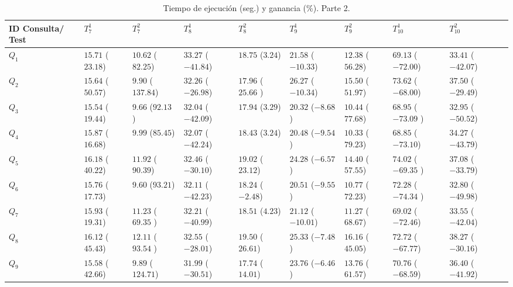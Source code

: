 \begin{table}
\renewcommand{\arraystretch}{1.3}
\begin{center}
\begin{tabular}{|p{1.5cm}|p{1.5cm}|p{1.5cm}|p{1.5cm}|p{1.5cm}|p{1.5cm}|p{1.5cm}|p{1.5cm}|p{1.5cm}|p{1.5cm}|}
\hline
\textbf{ID Consulta/ Test} & $T^{1}_{7}$ & $T^{2}_{7}$ & $T^{1}_{8}$ & $T^{2}_{8}$ & $T^{1}_{9}$ & $T^{2}_{9}$ & $T^{1}_{10}$ & $T^{2}_{10}$\\ \hline
  $Q_1$ & $15.71$ ($23.18$)  & $10.62$ ($82.25$) & $33.27$ ($-41.84$) & $18.75$ ($3.24$) & $21.58$ ($-10.33$) & $12.38$ ($56.28$) & $69.13$ ($-72.00$) & $33.41$ ($-42.07$) \\ \hline
  $Q_2$ & $15.64$ ($50.57$)  & $9.90$ ($137.84$) & $32.26$ ($-26.98$) & $17.96$ ($25.66$ ) & $26.27$ ($-10.34$) & $15.50$ ($51.97$) & $73.62$ ($-68.00$) & $37.50$ ($-29.49$) \\ \hline
  $Q_3$ & $15.54$ ($19.44$)  & $9.66$ ($92.13$ ) & $32.04$ ($-42.09$) & $17.94$ ($3.29$) & $20.32$ ($-8.68$) & $10.44$ ($77.68$) & $68.95$ ($-73.09$ ) & $32.95$ ($-50.52$) \\ \hline
  $Q_4$ & $15.87$ ($16.68$)  & $9.99$ ($85.45$) & $32.07$ ($-42.24$) & $18.43$ ($3.24$) & $20.48$ ($-9.54$) & $10.33$ ($79.23$) & $68.85$ ($-73.10$) & $34.27$ ($-43.79$) \\ \hline
  $Q_5$ & $16.18$ ($40.22$)  & $11.92$ ($90.39$) & $32.46$ ($-30.10$) & $19.02$ ($23.12$) & $24.28$ ($-6.57$) & $14.40$ ($57.55$) & $74.02$ ($-69.35$ ) & $37.08$ ($-33.79$) \\ \hline
  $Q_6$ & $15.76$ ($17.73$)  & $9.60$ ($93.21$) & $32.11$ ($-42.23$) & $18.24$ ($-2.48$) & $20.51$ ($-9.55$) & $10.77$ ($72.23$) & $72.28$ ($-74.34$ ) & $32.80$ ($-49.98$) \\ \hline
  $Q_7$ & $15.93$ ($19.31$)  & $11.23$ ($69.35$ ) & $32.21$ ($-40.99$) & $18.51$ ($4.23$) & $21.12$ ($-10.01$) & $11.27$ ($68.67$) & $69.02$ ($-72.46$) & $33.55$ ($-42.04$) \\ \hline
  $Q_8$ & $16.12$ ($45.43$)  & $12.11$ ($93.54$ ) & $32.55$ ($-28.01$) & $19.50$ ($26.61$) & $25.33$ ($-7.48$) & $16.16$ ($45.05$) & $72.72$ ($-67.77$) & $38.27$ ($-30.16$) \\ \hline
  $Q_9$ & $15.58$ ($42.66$)  & $9.89$ ($124.71$) & $31.99$ ($-30.51$) & $17.74$ ($14.01$) & $23.76$ ($-6.46$) & $13.76$ ($61.57$) & $70.76$ ($-68.59$) & $36.40$ ($-41.92$) \\ \hline
  \hline
  \end{tabular}
  \caption{Tiempo de ejecución (seg.) y ganancia (\%). Parte 2.}
  \label{tabla:results-2}
  \end{center}
\end{table} 


